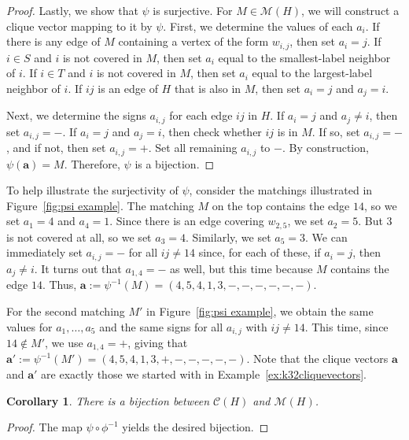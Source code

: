 \documentclass[12pt]{amsart}
\newtheorem{corollary}[theorem]{Corollary}
\theoremstyle{definition}
\newcommand\ba{\mathbf{a}}
\newcommand\calM{\mathcal{M}}
\newcommand{\cliques}{\mathcal{C}}
\begin{document}
\begin{proof}
    Lastly, we show that $\psi$ is surjective.
    For $M \in \calM(H)$, we will construct a clique vector mapping to it by $\psi$.
    First, we determine the values of each $a_i$.
    If there is any edge of $M$ containing a vertex of the form $w_{i,j}$, then set $a_i = j$. 
    If $i \in S$ and $i$ is not covered in $M$, then set $a_i$ equal to the smallest-label neighbor of $i$.
    If $i \in T$ and $i$ is not covered in $M$, then set $a_i$ equal to the largest-label neighbor of $i$.
    If $ij$ is an edge of $H$ that is also in $M$, then set $a_i = j$ and $a_j = i$.

    Next, we determine the signs $a_{i,j}$ for each edge $ij$ in $H$.
    If $a_i = j$ and $a_j \neq i$, then set $a_{i,j} = -$.
    If $a_i = j$ and $a_j = i$, then check whether $ij$ is in $M$.
    If so, set $a_{i,j} = -$, and if not, then set $a_{i,j} = +$.
    Set all remaining $a_{i,j}$ to $-$.
    By construction, $\psi(\ba) = M$.
    Therefore, $\psi$ is a bijection.
\end{proof}

To help illustrate the surjectivity of $\psi$, consider the matchings illustrated in Figure~\ref{fig:psi example}.
The matching $M$ on the top contains the edge $14$, so we set $a_1 = 4$ and $a_4 = 1$.
Since there is an edge covering $w_{2,5}$, we set $a_2 = 5$.
But $3$ is not covered at all, so we set $a_3 = 4$.
Similarly, we set $a_5 = 3$.
We can immediately set $a_{i,j} = -$ for all $ij \neq 14$ since, for each of these, if $a_i = j$, then $a_j \neq i$.
It turns out that $a_{1,4} = -$ as well, but this time because $M$ contains the edge $14$.
Thus, $\ba := \psi^{-1}(M) = (4,5,4,1,3,-,-,-,-,-,-)$.

For the second matching $M'$ in Figure~\ref{fig:psi example}, we obtain the same values for $a_1,\dots,a_5$ and the same signs for all $a_{i,j}$ with $ij \neq 14$.
This time, since $14 \notin M'$, we use $a_{1,4} = +$, giving that
$\ba' :=\psi^{-1}(M') = (4,5,4,1,3,+,-,-,-,-,-)$.
Note that the clique vectors $\ba$ and $\ba'$ are exactly those we started with in Example~\ref{ex:k32cliquevectors}.

\begin{corollary}\label{cor:cliquematchingbijection}
    There is a bijection between $\cliques(H)$ and $\calM(H)$.    
\end{corollary}

\begin{proof}
    The map $\psi\circ\phi^{-1}$ yields the desired bijection.
\end{proof}
\end{document}
